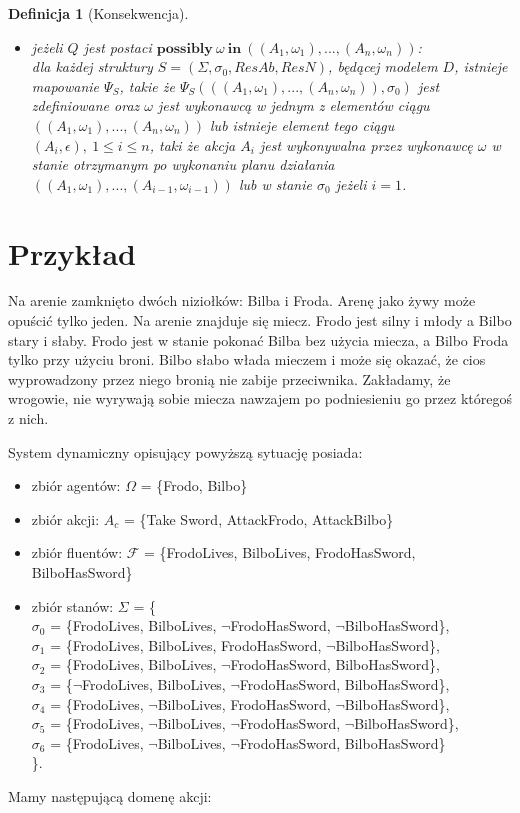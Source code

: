 \documentclass[11pt,a4paper]{article}
\newtheorem{definition}{Definicja}[section]
\begin{document}
\begin{definition}[Konsekwencja]
\begin{itemize}
    	 \item jeżeli $Q$ jest postaci $\mathbf{possibly}~\omega~\mathbf{in}~((A_1, \omega_1),...,(A_n,\omega_n))$: \\
    	 dla każdej struktury $S=(\Sigma, \sigma_0, ResAb, ResN)$, będącej modelem $D$, istnieje mapowanie $\Psi_S$, takie że $\Psi_S(((A_1, \omega_1), ..., (A_n, \omega_n)), \sigma_0)$ jest zdefiniowane oraz $\omega$ jest wykonawcą w jednym z elementów ciągu $((A_1, \omega_1),...,(A_n,\omega_n))$ lub istnieje element tego ciągu $(A_i, \epsilon),~1 \leq i \leq n$, taki że akcja $A_i$ jest wykonywalna przez wykonawcę $\omega$ w stanie otrzymanym po wykonaniu planu działania $((A_1, \omega_1),...,(A_{i-1},\omega_{i-1}))$ lub w stanie $\sigma_0$ jeżeli $i=1$.
    \end{itemize}
    \end{definition}
    
    \section{Przykład}
    
    Na arenie zamknięto dwóch niziołków: Bilba i Froda. Arenę jako żywy może opuścić tylko jeden. Na arenie znajduje się miecz. Frodo jest silny i młody a Bilbo stary i słaby. Frodo jest w stanie pokonać Bilba bez użycia miecza, a Bilbo Froda tylko przy użyciu broni. Bilbo słabo włada mieczem i może się okazać, że cios wyprowadzony przez niego bronią nie zabije przeciwnika. Zakładamy, że wrogowie, nie wyrywają sobie miecza nawzajem po podniesieniu go przez któregoś z nich.
    
    System dynamiczny opisujący powyższą sytuację posiada:
    \begin{itemize}
    \item zbiór agentów: $\Omega$ = \{Frodo, Bilbo\}
    \item zbiór akcji: $A_c$ = \{Take Sword, AttackFrodo, AttackBilbo\}
    \item zbiór fluentów: $\mathcal{F}$ = \{FrodoLives, BilboLives, FrodoHasSword, BilboHasSword\}
    \item zbiór stanów: $\Sigma$ = \{\\
    	$\sigma_0$ = \{FrodoLives, BilboLives, $\neg$FrodoHasSword, $\neg$BilboHasSword\},\\
    	$\sigma_1$ = \{FrodoLives, BilboLives, FrodoHasSword, $\neg$BilboHasSword\},\\
    	$\sigma_2$ = \{FrodoLives, BilboLives, $\neg$FrodoHasSword, BilboHasSword\},\\
    	$\sigma_3$ = \{$\neg$FrodoLives, BilboLives, $\neg$FrodoHasSword, BilboHasSword\},\\
    	$\sigma_4$ = \{FrodoLives, $\neg$BilboLives, FrodoHasSword, $\neg$BilboHasSword\},\\
    	$\sigma_5$ = \{FrodoLives, $\neg$BilboLives, $\neg$FrodoHasSword, $\neg$BilboHasSword\},\\
    	$\sigma_6$ = \{FrodoLives, $\neg$BilboLives, $\neg$FrodoHasSword, BilboHasSword\}\\
    \}.
    \end{itemize}
    Mamy następującą domenę akcji:
    
\end{document}
